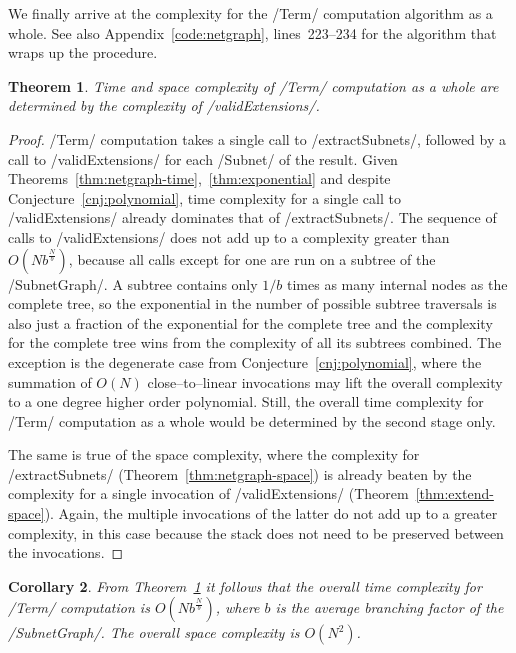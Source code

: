 \documentclass[12pt,a4paper]{article}
\newtheorem{theorem}{Theorem}
\newtheorem{corollary}[theorem]{Corollary}
\begin{document}
We finally arrive at the complexity for the \hs/Term/ computation algorithm as a whole. See also Appendix~\ref{code:netgraph}, lines~223--234 for the algorithm that wraps up the procedure.
\begin{theorem}\label{thm:deciding-complexity}
    Time and space complexity of \hs/Term/ computation as a whole are determined by the complexity of \hs/validExtensions/.
\end{theorem}
\begin{proof}
    \hs/Term/ computation takes a single call to \hs/extractSubnets/, followed by a call to \hs/validExtensions/ for each \hs/Subnet/ of the result. Given Theorems~\ref{thm:netgraph-time},~\ref{thm:exponential} and despite Conjecture~\ref{cnj:polynomial}, time complexity for a single call to \hs/validExtensions/ already dominates that of \hs/extractSubnets/. The sequence of calls to \hs/validExtensions/ does not add up to a complexity greater than $O(Nb^{\frac{N}{b}})$, because all calls except for one are run on a subtree of the \hs/SubnetGraph/. A subtree contains only $1/b$ times as many internal nodes as the complete tree, so the exponential in the number of possible subtree traversals is also just a fraction of the exponential for the complete tree and the complexity for the complete tree wins from the complexity of all its subtrees combined. The exception is the degenerate case from Conjecture~\ref{cnj:polynomial}, where the summation of $O(N)$ close--to--linear invocations may lift the overall complexity to a one degree higher order polynomial. Still, the overall time complexity for \hs/Term/ computation as a whole would be determined by the second stage only.
    
    The same is true of the space complexity, where the complexity for \hs/extractSubnets/ (Theorem~\ref{thm:netgraph-space}) is already beaten by the complexity for a single invocation of \hs/validExtensions/ (Theorem~\ref{thm:extend-space}). Again, the multiple invocations of the latter do not add up to a greater complexity, in this case because the stack does not need to be preserved between the invocations.
\end{proof}

\begin{corollary}
    From Theorem~\ref{thm:deciding-complexity} it follows that the overall time complexity for \hs/Term/ computation is $O(Nb^{\frac{N}{b}})$, where $b$ is the average branching factor of the \hs/SubnetGraph/. The overall space complexity is $O(N^2)$.
\end{corollary}
\end{document}
